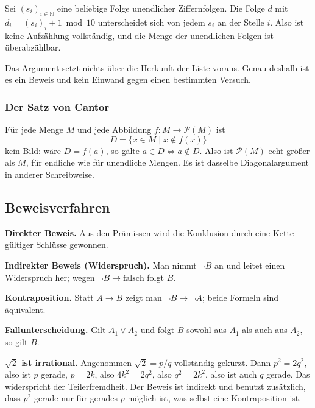 \documentclass[12pt, a4paper]{article}
\begin{document}
\begin{definitionbox}
Sei $(s_i)_{i \in \mathbb{N}}$ eine beliebige Folge unendlicher
Ziffernfolgen. Die Folge $d$ mit $d_i = (s_i)_i + 1 \bmod 10$ unterscheidet
sich von jedem $s_i$ an der Stelle $i$. Also ist keine Aufzählung
vollständig, und die Menge der unendlichen Folgen ist überabzählbar.
\end{definitionbox}

Das Argument setzt nichts über die Herkunft der Liste voraus. Genau deshalb
ist es ein Beweis und kein Einwand gegen einen bestimmten Versuch.

\subsubsection{Der Satz von Cantor}

Für jede Menge $M$ und jede Abbildung $f: M \to \mathcal{P}(M)$ ist
\[
  D = \{ x \in M \mid x \notin f(x) \}
\]
kein Bild: wäre $D = f(a)$, so gälte $a \in D \iff a \notin D$. Also ist
$\mathcal{P}(M)$ echt größer als $M$, für endliche wie für unendliche Mengen.
Es ist dasselbe Diagonalargument in anderer Schreibweise.

\subsection{Beweisverfahren}

\begin{definitionbox}
\textbf{Direkter Beweis.} Aus den Prämissen wird die Konklusion durch eine
Kette gültiger Schlüsse gewonnen.

\textbf{Indirekter Beweis (Widerspruch).} Man nimmt $\neg B$ an und leitet
einen Widerspruch her; wegen $\neg B \to \text{falsch}$ folgt $B$.

\textbf{Kontraposition.} Statt $A \to B$ zeigt man $\neg B \to \neg A$;
beide Formeln sind äquivalent.

\textbf{Fallunterscheidung.} Gilt $A_1 \vee A_2$ und folgt $B$ sowohl aus
$A_1$ als auch aus $A_2$, so gilt $B$.
\end{definitionbox}

\begin{examplebox}
\textbf{$\sqrt{2}$ ist irrational.} Angenommen $\sqrt{2} = p/q$ vollständig
gekürzt. Dann $p^2 = 2q^2$, also ist $p$ gerade, $p = 2k$, also
$4k^2 = 2q^2$, also $q^2 = 2k^2$, also ist auch $q$ gerade. Das widerspricht
der Teilerfremdheit. Der Beweis ist indirekt und benutzt zusätzlich, dass
$p^2$ gerade nur für gerades $p$ möglich ist, was selbst eine
Kontraposition ist.
\end{examplebox}
\end{document}
